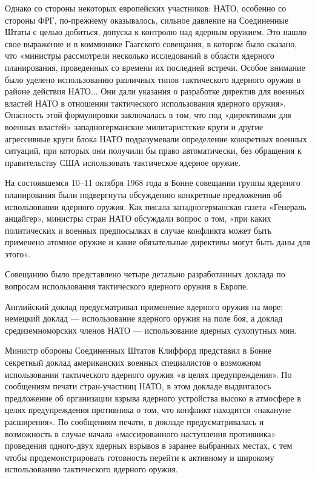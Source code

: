 \documentclass[12pt, a4paper, openany]{book}
\begin{document}
	Однако со стороны некоторых европейских участников: НАТО, особенно со стороны ФРГ, по-прежнему оказывалось, сильное давление на Соединенные Штаты с целью добиться, допуска к контролю над ядерным оружием. Это нашло свое выражение и в коммюнике Гаагского совещания, в котором было сказано, что «министры рассмотрели несколько исследований в области ядерного планирования, проведенных со времени их последней встречи. Особое внимание было уделено использованию различных типов тактического ядерного оружия в районе действия НАТО... Они дали указания о разработке директив для военных властей НАТО в отношении тактического использования ядерного оружия». Опасность этой формулировки заключалась в том, что под «директивами для военных властей» западногерманские милитаристские круги и другие агрессивные круги блока НАТО подразумевали определение конкретных военных ситуаций, при которых они получили бы право автоматически, без обращения к правительству США использовать тактическое ядерное оружие.
	
	На состоявшемся 10–11 октября 1968 года в Бонне совещании группы ядерного планирования были подвергнуты обсуждению конкретные предложения об использовании ядерного оружия. Как писала западногерманская газета «Генераль анцайгер», министры стран НАТО обсуждали вопрос о том, «при каких политических и военных предпосылках в случае конфликта может быть применено атомное оружие и какие обязательные директивы могут быть даны для этого».
	
	Совещанию было представлено четыре детально разработанных доклада по вопросам использования тактического ядерного оружия в Европе.
	
	Английский доклад предусматривал применение ядерного оружия на море; немецкий доклад — использование ядерного оружия на поле боя, а доклад средиземноморских членов НАТО — использование ядерных сухопутных мин.
	
	Министр обороны Соединенных Штатов Клиффорд представил в Бонне секретный доклад американских военных специалистов о возможном использовании тактического ядерного оружия «в целях предупреждения». По сообщениям печати стран-участниц НАТО, в этом докладе выдвигалось предложение об организации взрыва ядерного устройства высоко в атмосфере в целях предупреждения противника о том, что конфликт находится «накануне расширения». По сообщениям печати, в докладе предусматривалась и возможность в случае начала «массированного наступления противника» проведения одного-двух ядерных взрывов в заранее выбранных местах, с тем чтобы продемонстрировать готовность перейти к активному и широкому использованию тактического ядерного оружия.
	
\end{document}
